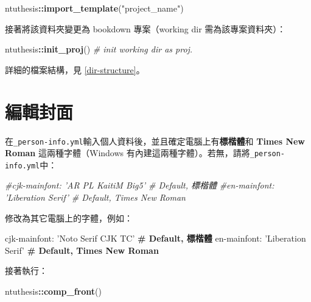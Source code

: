\documentclass[oneside]{book}
\newenvironment{Shaded}{\begin{snugshade}}{\end{snugshade}}
\newcommand{\AttributeTok}[1]{\textcolor[rgb]{0.77,0.63,0.00}{#1}}
\newcommand{\CommentTok}[1]{\textcolor[rgb]{0.56,0.35,0.01}{\textit{#1}}}
\newcommand{\ErrorTok}[1]{\textcolor[rgb]{0.64,0.00,0.00}{\textbf{#1}}}
\newcommand{\FunctionTok}[1]{\textcolor[rgb]{0.00,0.00,0.00}{#1}}
\newcommand{\KeywordTok}[1]{\textcolor[rgb]{0.13,0.29,0.53}{\textbf{#1}}}
\newcommand{\NormalTok}[1]{#1}
\newcommand{\OperatorTok}[1]{\textcolor[rgb]{0.81,0.36,0.00}{\textbf{#1}}}
\newcommand{\StringTok}[1]{\textcolor[rgb]{0.31,0.60,0.02}{#1}}
\theoremstyle{definition}
\theoremstyle{definition}
\theoremstyle{definition}
\theoremstyle{remark}
\begin{document}
\begin{Shaded}
\begin{Highlighting}[]
\NormalTok{ntuthesis}\OperatorTok{::}\KeywordTok{import_template}\NormalTok{(}\StringTok{"project_name"}\NormalTok{)}
\end{Highlighting}
\end{Shaded}

接著將該資料夾變更為 bookdown 專案（working dir 需為該專案資料夾）：

\begin{Shaded}
\begin{Highlighting}[]
\NormalTok{ntuthesis}\OperatorTok{::}\KeywordTok{init_proj}\NormalTok{()  }\CommentTok{# init working dir as proj.}
\end{Highlighting}
\end{Shaded}

詳細的檔案結構，見 \ref{dir-structure}。

\hypertarget{edit-front-matter}{%
\section{編輯封面}\label{edit-front-matter}}

在\texttt{\_person-info.yml}輸入個人資料後，並且確定電腦上有\textbf{標楷體}和 \textbf{Times New Roman} 這兩種字體（Windows 有內建這兩種字體）。若無，請將\texttt{\_person-info.yml}中：

\begin{Shaded}
\begin{Highlighting}[]
\CommentTok{#cjk-mainfont: 'AR PL KaitiM Big5'  # Default, 標楷體}
\CommentTok{#en-mainfont: 'Liberation Serif'  # Default, Times New Roman}
\end{Highlighting}
\end{Shaded}

修改為其它電腦上的字體，例如：

\begin{Shaded}
\begin{Highlighting}[]
\FunctionTok{cjk-mainfont:}\AttributeTok{ }\StringTok{'Noto Serif CJK TC'}\ErrorTok{  # Default, 標楷體}
\FunctionTok{en-mainfont:}\AttributeTok{ }\StringTok{'Liberation Serif'}\ErrorTok{  # Default, Times New Roman}
\end{Highlighting}
\end{Shaded}

接著執行：

\begin{Shaded}
\begin{Highlighting}[]
\NormalTok{ntuthesis}\OperatorTok{::}\KeywordTok{comp_front}\NormalTok{()}
\end{Highlighting}
\end{Shaded}
\end{document}
